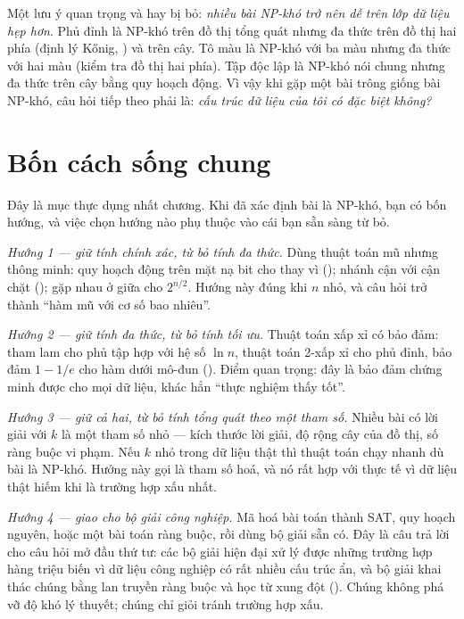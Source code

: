 \documentclass[../../algorithm.tex]{subfiles}
\begin{document}
Một lưu ý quan trọng và hay bị bỏ: \emph{nhiều bài NP-khó trở nên dễ trên lớp dữ liệu hẹp hơn}. Phủ đỉnh là NP-khó trên đồ thị tổng quát nhưng đa thức trên đồ thị hai phía (định lý Kőnig, ) và trên cây. Tô màu là NP-khó với ba màu nhưng đa thức với hai màu (kiểm tra đồ thị hai phía). Tập độc lập là NP-khó nói chung nhưng đa thức trên cây bằng quy hoạch động. Vì vậy khi gặp một bài trông giống bài NP-khó, câu hỏi tiếp theo phải là: \emph{cấu trúc dữ liệu của tôi có đặc biệt không?}

\section{Bốn cách sống chung}

Đây là mục thực dụng nhất chương. Khi đã xác định bài là NP-khó, bạn có bốn hướng, và việc chọn hướng nào phụ thuộc vào cái bạn sẵn sàng từ bỏ.

\emph{Hướng 1 --- giữ tính chính xác, từ bỏ tính đa thức.} Dùng thuật toán mũ nhưng thông minh: quy hoạch động trên mặt nạ bit cho  thay vì  (); nhánh cận với cận chặt (); gặp nhau ở giữa cho \(2^{n/2}\). Hướng này đúng khi \(n\) nhỏ, và câu hỏi trở thành ``hàm mũ với cơ số bao nhiêu''.

\emph{Hướng 2 --- giữ tính đa thức, từ bỏ tính tối ưu.} Thuật toán xấp xỉ có bảo đảm: tham lam cho phủ tập hợp với hệ số \(\ln n\), thuật toán 2-xấp xỉ cho phủ đỉnh, bảo đảm \(1-1/e\) cho hàm dưới mô-đun (). Điểm quan trọng: đây là bảo đảm chứng minh được cho mọi dữ liệu, khác hẳn ``thực nghiệm thấy tốt''.

\emph{Hướng 3 --- giữ cả hai, từ bỏ tính tổng quát theo một tham số.} Nhiều bài có lời giải  với \(k\) là một tham số nhỏ --- kích thước lời giải, độ rộng cây của đồ thị, số ràng buộc vi phạm. Nếu \(k\) nhỏ trong dữ liệu thật thì thuật toán chạy nhanh dù bài là NP-khó. Hướng này gọi là tham số hoá, và nó rất hợp với thực tế vì dữ liệu thật hiếm khi là trường hợp xấu nhất.

\emph{Hướng 4 --- giao cho bộ giải công nghiệp.} Mã hoá bài toán thành SAT, quy hoạch nguyên, hoặc một bài toán ràng buộc, rồi dùng bộ giải sẵn có. Đây là câu trả lời cho câu hỏi mở đầu thứ tư: các bộ giải hiện đại xử lý được những trường hợp hàng triệu biến vì dữ liệu công nghiệp có rất nhiều cấu trúc ẩn, và bộ giải khai thác chúng bằng lan truyền ràng buộc và học từ xung đột (). Chúng không phá vỡ độ khó lý thuyết; chúng chỉ giỏi tránh trường hợp xấu.
\end{document}
